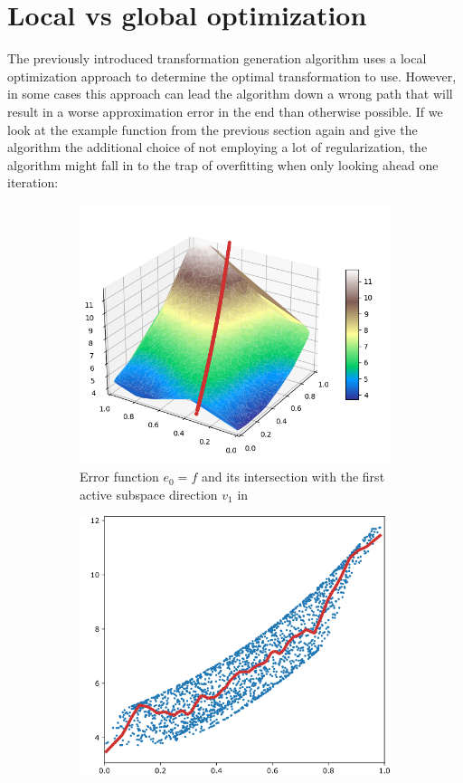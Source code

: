 \documentclass[
  a4paper,  %
  twoside,  %
  bibliography=totoc,
  headsepline,
  cleardoublepage=empty,
  parskip=half,
  draft=false
]{scrbook}
\begin{document}
\section{Local vs global optimization}
\label{sec:lvsg}

The previously introduced transformation generation algorithm uses a local optimization approach to determine the optimal transformation to use.
However, in some cases this approach can lead the algorithm down a wrong path that will result in a worse approximation error in the end than otherwise possible.
If we look at the example function from the previous section again and give the algorithm the additional choice of not employing a lot of regularization, the algorithm might fall in to the trap of overfitting when only looking ahead one iteration:
\begin{mdframed}[style=style]
\begin{figure}[H]
\begin{subfigure}{.5\textwidth}
  \centering
  \includegraphics[width=.75\linewidth]{graphics/pipeline_bad_current_1.png}
  \caption{Error function $e_0=f$ and its intersection with the first active subspace direction $v_1$ in \reddot}
\label{fig:pipeline_bad_current_1}
\end{subfigure}%
\begin{subfigure}{.5\textwidth}
  \centering
  \includegraphics[width=.75\linewidth]{graphics/pipeline_bad_local_1.png}

\end{subfigure}
\end{figure}
\end{mdframed}
\end{document}
